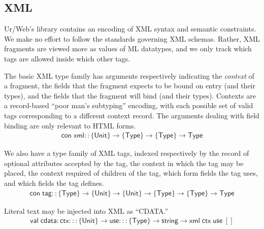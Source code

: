 \documentclass{article}
\newcommand{\mt}[1]{\mathsf{#1}}
\begin{document}
\subsection{XML}

Ur/Web's library contains an encoding of XML syntax and semantic constraints.  We make no effort to follow the standards governing XML schemas.  Rather, XML fragments are viewed more as values of ML datatypes, and we only track which tags are allowed inside which other tags.

The basic XML type family has arguments respectively indicating the \emph{context} of a fragment, the fields that the fragment expects to be bound on entry (and their types), and the fields that the fragment will bind (and their types).  Contexts are a record-based ``poor man's subtyping'' encoding, with each possible set of valid tags corresponding to a different context record.  The arguments dealing with field binding are only relevant to HTML forms.
$$\begin{array}{l}
  \mt{con} \; \mt{xml} :: \{\mt{Unit}\} \to \{\mt{Type}\} \to \{\mt{Type}\} \to \mt{Type}
\end{array}$$

We also have a type family of XML tags, indexed respectively by the record of optional attributes accepted by the tag, the context in which the tag may be placed, the context required of children of the tag, which form fields the tag uses, and which fields the tag defines.
$$\begin{array}{l}
  \mt{con} \; \mt{tag} :: \{\mt{Type}\} \to \{\mt{Unit}\} \to \{\mt{Unit}\} \to \{\mt{Type}\} \to \{\mt{Type}\} \to \mt{Type}
\end{array}$$

Literal text may be injected into XML as ``CDATA.''
$$\begin{array}{l}
  \mt{val} \; \mt{cdata} : \mt{ctx} ::: \{\mt{Unit}\} \to \mt{use} ::: \{\mt{Type}\} \to \mt{string} \to \mt{xml} \; \mt{ctx} \; \mt{use} \; []
\end{array}$$
\end{document}
